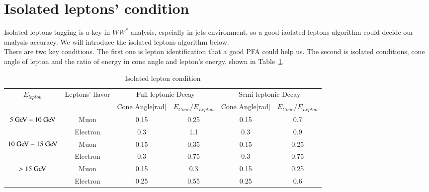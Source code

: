 \documentclass[11pt,a4paper]{cepcnote}
\begin{document}
\section{Isolated leptons' condition}
\label{app:isolepcondition}
Isolated leptons tagging is a key in $WW^*$ analysis, espcially in jets environment, so a good iaolated leptons algorithm
could decide our analysis accuracy. We will introduce the isolated leptons algorithm below:\\
There are two key conditions. The first one is lepton identification that a good PFA could help us.
The second is isolated conditions, cone angle of lepton and the ratio of energy in cone angle and lepton's energy, 
shown in Table~\ref{tab:isolep}.
\begin{table}[H]
\begin{center}
\begin{tabular}{cccccc}
\hline \hline
\multirow{2}{*}{$E_{lepton}$} & \multirow{2}{*}{Leptons' flavor} 	& \multicolumn{2}{c}{Full-leptonic Decay} 
& \multicolumn{2}{c}{Semi-leptonic Decay}\\
							&									&Cone Angle[rad]&$E_{Cone}/E_{Lepton}$
							&Cone Angle[rad]&$E_{Cone}/E_{Lepton}$\\
\hline
\multirow{2}{*}{$5\gev-10\gev$}	&			Muon					&0.15		&0.25		&0.15		&0.7	\\
							&			Electron				&0.3		&1.1		&0.3		&0.9	\\
\hline
\multirow{2}{*}{$10\gev-15\gev$}	&			Muon					&0.15		&0.35		&0.15		&0.25	\\
							&			Electron				&0.3		&0.75		&0.3		&0.75	\\
\hline
\multirow{2}{*}{$>15\gev$}	&			Muon					&0.15		&0.3		&0.15		&0.25	\\
							&			Electron				&0.25		&0.55		&0.25		&0.6	\\
\hline \hline
\end{tabular}
\caption{Isolated lepton condition}
\label{tab:isolep}
\end{center}
\end{table}
%
\end{document}
